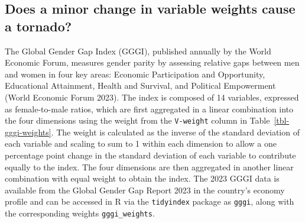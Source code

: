 \documentclass[
]{interact}
\begin{document}
\hypertarget{does-a-minor-change-in-variable-weights-cause-a-tornado}{%
\subsection{Does a minor change in variable weights cause a
tornado?}\label{does-a-minor-change-in-variable-weights-cause-a-tornado}}

The Global Gender Gap Index (GGGI), published annually by the World
Economic Forum, measures gender parity by assessing relative gaps
between men and women in four key areas: Economic Participation and
Opportunity, Educational Attainment, Health and Survival, and Political
Empowerment (World Economic Forum 2023). The index is composed of 14
variables, expressed as female-to-male ratios, which are first
aggregated in a linear combination into the four dimensions using the
weight from the \texttt{V-weight} column in
Table~\ref{tbl-gggi-weights}. The weight is calculated as the inverse of
the standard deviation of each variable and scaling to sum to 1 within
each dimension to allow a one percentage point change in the standard
deviation of each variable to contribute equally to the index. The four
dimensions are then aggregated in another linear combination with equal
weight to obtain the index. The 2023 GGGI data is available from the
Global Gender Gap Report 2023 in the country's economy profile and can
be accessed in R via the \texttt{tidyindex} package as \texttt{gggi},
along with the corresponding weights \texttt{gggi\_weights}.
\end{document}
